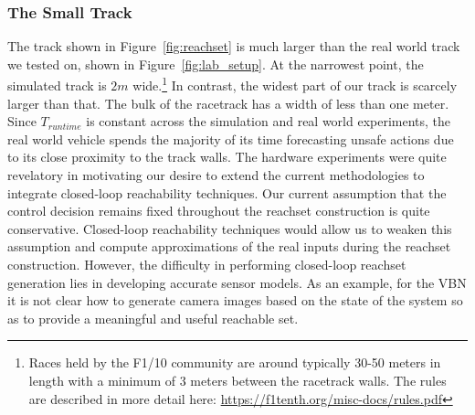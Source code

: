 \documentclass[manuscript,screen,review]{acmart}
\newcommand{\diego}[1]{\textcolor{purple}{\textbf{\underline{DM:}} #1}}
\newcommand{\figref}[1]{Figure~\ref{#1}}
\begin{document}
\subsubsection{The Small Track} The track shown in \figref{fig:reachset} is much larger than the real world track we tested on, shown in \figref{fig:lab_setup}. At the narrowest point, the simulated track is $2m$ wide.\footnote{Races held by the F1/10 community are around typically 30-50 meters in length with a minimum of 3 meters between the racetrack walls. The rules are described in more detail here: \url{https://f1tenth.org/misc-docs/rules.pdf}} In contrast, the widest part of our track is scarcely larger than that. The bulk of the racetrack has a width of less than one meter. Since $T_{runtime}$ is constant across the simulation and real world experiments, the real world vehicle spends the majority of its time forecasting unsafe actions due to its close proximity to the track walls. The hardware experiments were quite revelatory in motivating our desire to extend the current methodologies to integrate closed-loop reachability techniques. Our current assumption that the control decision remains fixed throughout the reachset construction is quite conservative. Closed-loop reachability techniques would allow us to weaken this assumption and compute approximations of the real inputs during the reachset construction. However, the difficulty in performing closed-loop reachset generation lies in developing accurate sensor models. As an example, for the VBN it is not clear how to generate camera images based on the state of the system so as to provide a meaningful and useful reachable set.
\end{document}

